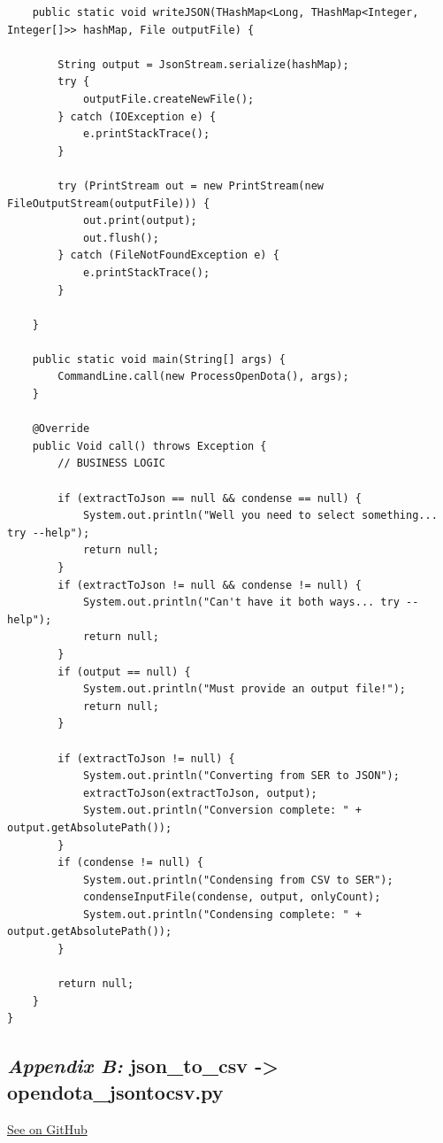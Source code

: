 \begin{verbatim}
    public static void writeJSON(THashMap<Long, THashMap<Integer, Integer[]>> hashMap, File outputFile) {

        String output = JsonStream.serialize(hashMap);
        try {
            outputFile.createNewFile();
        } catch (IOException e) {
            e.printStackTrace();
        }

        try (PrintStream out = new PrintStream(new FileOutputStream(outputFile))) {
            out.print(output);
            out.flush();
        } catch (FileNotFoundException e) {
            e.printStackTrace();
        }

    }

    public static void main(String[] args) {
        CommandLine.call(new ProcessOpenDota(), args);
    }

    @Override
    public Void call() throws Exception {
        // BUSINESS LOGIC

        if (extractToJson == null && condense == null) {
            System.out.println("Well you need to select something... try --help");
            return null;
        }
        if (extractToJson != null && condense != null) {
            System.out.println("Can't have it both ways... try --help");
            return null;
        }
        if (output == null) {
            System.out.println("Must provide an output file!");
            return null;
        }

        if (extractToJson != null) {
            System.out.println("Converting from SER to JSON");
            extractToJson(extractToJson, output);
            System.out.println("Conversion complete: " + output.getAbsolutePath());
        }
        if (condense != null) {
            System.out.println("Condensing from CSV to SER");
            condenseInputFile(condense, output, onlyCount);
            System.out.println("Condensing complete: " + output.getAbsolutePath());
        }

        return null;
    }
}
\end{verbatim}

\subsection*{\emph{Appendix B:} json\_to\_csv -> opendota\_jsontocsv.py}
\label{subsec:json-to-csv}

\href{https://github.com/marcolussetti/opendotadump-tools/blob/master/json_to_csv/opendota_jsontocsv.py}{See on GitHub}

